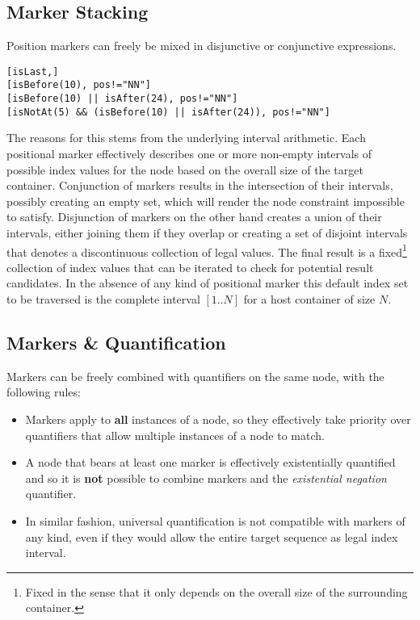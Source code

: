 \documentclass[11pt,a4paper]{report}
\begin{document}
\subsection{Marker Stacking}
\label{sec:marker-stacking}
Position markers can freely be mixed in disjunctive or conjunctive expressions.
\begin{Verbatim}[samepage=true]
[isLast,]
[isBefore(10), pos!="NN"]
[isBefore(10) || isAfter(24), pos!="NN"]
[isNotAt(5) && (isBefore(10) || isAfter(24)), pos!="NN"]
\end{Verbatim}
The reasons for this stems from the underlying interval arithmetic.
Each positional marker effectively describes one or more non-empty intervals of possible index values for the node based on the overall size of the target container.
Conjunction of markers results in the intersection of their intervals, possibly creating an empty set, which will render the node constraint impossible to satisfy.
Disjunction of markers on the other hand creates a union of their intervals, either joining them if they overlap or creating a set of disjoint intervals that denotes a discontinuous collection of legal values.
The final result is a fixed\footnote{Fixed in the sense that it only depends on the overall size of the surrounding container.} collection of index values that can be iterated to check for potential result candidates.
In the absence of any kind of positional marker this default index set to be traversed is the complete interval $[1..N]$ for a host container of size $N$.

\subsection{Markers \& Quantification}
\label{sec:marker-quantification}
Markers can be freely combined with quantifiers on the same node, with the following rules:
\begin{itemize}
	\item Markers apply to \textbf{all} instances of a node, so they effectively take priority over quantifiers that allow multiple instances of a node to match.
	\item A node that bears at least one marker is effectively existentially quantified and so it is \textbf{not} possible to combine markers and the \textit{existential negation} quantifier.
	\item In similar fashion, universal quantification is not compatible with markers of any kind, even if they would allow the entire target sequence as legal index interval.
\end{itemize}
\end{document}
